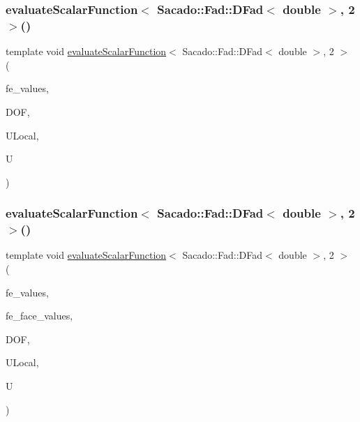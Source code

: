 \mbox{\label{function_evaluations_8cc_af8ed01aa7f3c36625c149e3600d96714}} 
\subsubsection{\texorpdfstring{evaluateScalarFunction$<$ Sacado::Fad::DFad$<$ double $>$, 2 $>$()}{evaluateScalarFunction< Sacado::Fad::DFad< double >, 2 >()}\hspace{0.1cm}{\footnotesize\ttfamily [1/2]}}
{\footnotesize\ttfamily template void \mbox{\hyperlink{group___evaluation_functions_ga2e2fbeb2173113c6889c73bbb7304789}{evaluate\+Scalar\+Function}}$<$ Sacado\+::\+Fad\+::\+D\+Fad$<$ double $>$, 2 $>$ (\begin{DoxyParamCaption}\item[{const F\+E\+Values$<$ 2 $>$ \&}]{fe\+\_\+values,  }\item[{unsigned int}]{D\+OF,  }\item[{Table$<$ 1, Sacado\+::\+Fad\+::\+D\+Fad$<$ double $>$$>$ \&}]{U\+Local,  }\item[{Table$<$ 1, Sacado\+::\+Fad\+::\+D\+Fad$<$ double $>$$>$ \&}]{U }\end{DoxyParamCaption})}

\mbox{\label{function_evaluations_8cc_ad678c1a358c17bdfbe0ddebfc9936057}} 
\subsubsection{\texorpdfstring{evaluateScalarFunction$<$ Sacado::Fad::DFad$<$ double $>$, 2 $>$()}{evaluateScalarFunction< Sacado::Fad::DFad< double >, 2 >()}\hspace{0.1cm}{\footnotesize\ttfamily [2/2]}}
{\footnotesize\ttfamily template void \mbox{\hyperlink{group___evaluation_functions_ga2e2fbeb2173113c6889c73bbb7304789}{evaluate\+Scalar\+Function}}$<$ Sacado\+::\+Fad\+::\+D\+Fad$<$ double $>$, 2 $>$ (\begin{DoxyParamCaption}\item[{const F\+E\+Values$<$ 2 $>$ \&}]{fe\+\_\+values,  }\item[{const F\+E\+Face\+Values$<$ 2 $>$ \&}]{fe\+\_\+face\+\_\+values,  }\item[{unsigned int}]{D\+OF,  }\item[{Table$<$ 1, Sacado\+::\+Fad\+::\+D\+Fad$<$ double $>$$>$ \&}]{U\+Local,  }\item[{Table$<$ 1, Sacado\+::\+Fad\+::\+D\+Fad$<$ double $>$$>$ \&}]{U }\end{DoxyParamCaption})}

